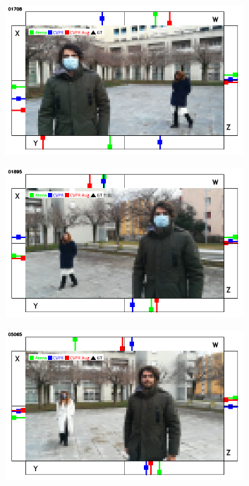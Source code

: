 \begin{figure}[H]
	\begin{center}
		\begin{subfigure}[h]{0.49\textwidth}
			\centering
			\includegraphics[width=0.98\textwidth]{"contents/images/qualitative-videos/double1-square02-1708"}
		\end{subfigure}
		\hfill
		\begin{subfigure}[h]{0.49\textwidth}
			\centering
			\includegraphics[width=0.98\textwidth]{"contents/images/qualitative-videos/double1-square02-1895"}
		\end{subfigure}
		\vfill
		\begin{subfigure}[h]{0.49\textwidth}
			\centering
			\includegraphics[width=0.98\textwidth]{"contents/images/qualitative-videos/double4-square02-5065"}

\end{subfigure}
\end{center}
\end{figure}
